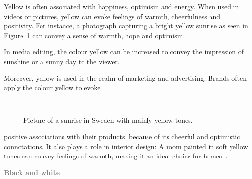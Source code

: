\documentclass[../MasterThesis.tex]{subfiles}
\begin{document}
%
\begin{minipage}{0.45\textwidth}
	Yellow is often associated with happiness, optimism and energy. When used in videos or pictures, yellow can evoke feelings of warmth, cheerfulness and positivity. For instance, a photograph capturing a bright yellow sunrise as seen in Figure~\ref{figure:yellow} can convey a sense of warmth, hope and optimism.
	
	In media editing, the colour yellow can be increased to convey the impression of sunshine or a sunny day to the viewer.
	
	Moreover, yellow is used in the realm of marketing and advertising. Brands often apply the colour yellow to evoke 
	
	
\end{minipage}\begin{minipage}{0.05\textwidth}
	\ 
\end{minipage}\begin{minipage}{0.5\textwidth}
	\begin{figure}[H]
		\begin{center}
			\caption[Picture of a sunrise in Sweden with mainly yellow tones.]{Picture of a sunrise in Sweden with mainly yellow tones.}
			\label{figure:yellow}
		\end{center}
	\end{figure}\hfill
\end{minipage}

positive associations with their products, because of its cheerful and optimistic connotations. It also plays a role in interior design: A room painted in soft yellow tones can convey feelings of warmth, making it an ideal choice for homes~\cite{colour2}.





\textbf{\textcolor{gray}{Black and white}}
\end{document}
